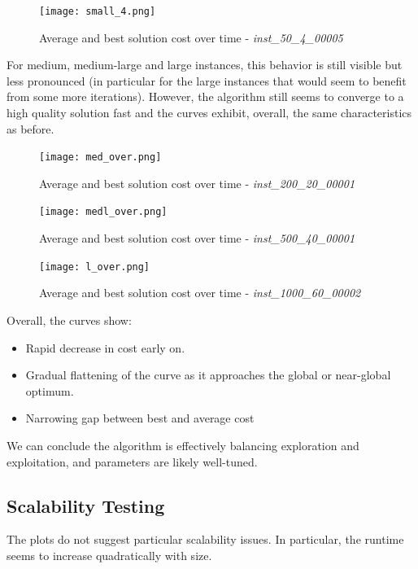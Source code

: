 \documentclass{article}
\begin{document}
\begin{figure}[H]
    \centering
    \texttt{[image: small\_4.png]}
    \caption{Average and best solution cost over time - \textit{inst\_50\_4\_00005}}
    \label{fig:enter-label}
\end{figure}

For medium, medium-large and large instances, this behavior is still visible but less pronounced (in particular for the large instances that would seem to benefit from some more iterations). However, the algorithm still seems to converge to a high quality solution fast and the curves exhibit, overall, the same characteristics as before. 

\begin{figure}[H]
    \centering
    \texttt{[image: med\_over.png]}
    \caption{Average and best solution cost over time - \textit{inst\_200\_20\_00001}}
    \label{fig:enter-label}
\end{figure}

\begin{figure}[H]
    \centering
    \texttt{[image: medl\_over.png]}
    \caption{Average and best solution cost over time - \textit{inst\_500\_40\_00001}}
    \label{fig:enter-label}
\end{figure}


\begin{figure}[H]
    \centering
    \texttt{[image: l\_over.png]}
    \caption{Average and best solution cost over time - \textit{inst\_1000\_60\_00002}}
    \label{fig:enter-label}
\end{figure}

Overall, the curves show:
\begin{itemize}
    \item Rapid decrease in cost early on.
    \item Gradual flattening of the curve as it approaches the global or near-global optimum.
    \item Narrowing gap between best and average cost
\end{itemize}

We can conclude the algorithm is effectively balancing exploration and exploitation, and parameters are likely well-tuned.

\subsection{Scalability Testing}

The plots do not suggest particular scalability issues. In particular, the runtime seems to increase quadratically with size. 
\end{document}
